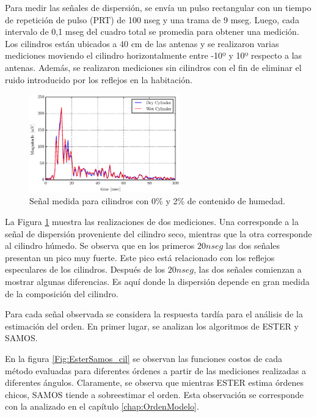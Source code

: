 	Para medir las señales de dispersión, se envía un pulso rectangular con un tiempo de repetición de pulso (PRT) de 100 nseg y una trama de 9 mseg. Luego, cada intervalo de 0,1 mseg del cuadro total se promedia para obtener una medición. Los cilindros están ubicados a 40 cm de las antenas y se realizaron varias mediciones moviendo el cilindro horizontalmente entre -10º y 10º respecto a las antenas. Además, se realizaron mediciones sin cilindros con el fin de eliminar el ruido introducido por los reflejos en la habitación.
	
	\begin{figure}[ht]
		\centerline{\includegraphics[width=6.5cm]{Figuras/senales}}
		\caption{Señal medida  para cilindros con 0\% y 2\% de contenido de humedad.}
		\label{Fig:backscattered}
	\end{figure}
	
	La Figura \ref{Fig:backscattered} muestra las realizaciones de dos mediciones. Una corresponde a la señal de dispersión proveniente del cilindro seco, mientras que la otra corresponde al cilindro húmedo. Se observa que en los primeros $20 nseg$ las dos señales presentan un pico muy fuerte. Este pico está relacionado con los reflejos especulares de los cilindros. Después de los $20 nseg$, las dos señales comienzan a mostrar algunas diferencias. Es aquí donde la dispersión depende en gran medida de la composición del cilindro.

     Para cada señal observada se considera la respuesta tardía para el análisis de la estimación del orden. En primer lugar, se analizan los algoritmos de ESTER y SAMOS. 

    En la figura \ref{Fig:EsterSamos_cil} se observan las funciones costos de cada método evaluadas para diferentes órdenes a partir de las mediciones realizadas a diferentes ángulos. Claramente, se observa que mientras ESTER estima órdenes chicos, SAMOS tiende a sobreestimar el orden. Esta observación se corresponde con la analizado en el capítulo \ref{chap:OrdenModelo}. 

